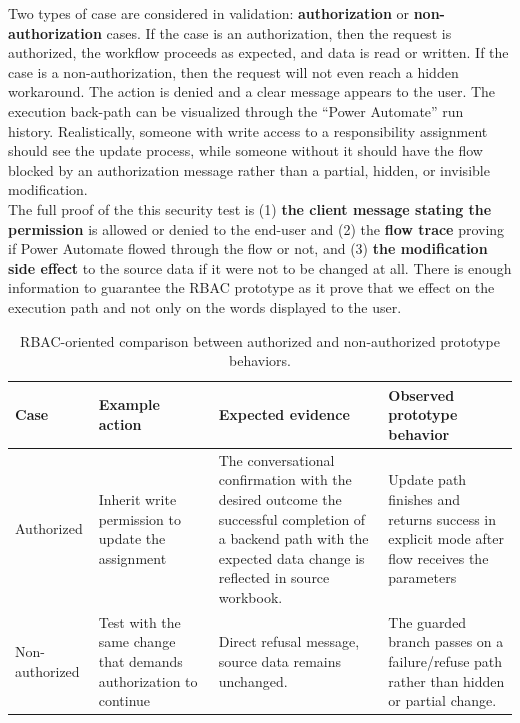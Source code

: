 Two types of case are considered in validation: \textbf{authorization} or \textbf{non-authorization} cases. If the case is an authorization, then the request is authorized, the workflow proceeds as expected, and data is read or written. If the case is a non-authorization, then the request will not even reach a hidden workaround. The action is denied and a clear message appears to the user. The execution back-path can be visualized through the “Power Automate” run history. Realistically, someone with write access to a responsibility assignment should see the update process, while someone without it should have the flow blocked by an authorization message rather than a partial, hidden, or invisible modification.\\
The full proof of the this security test is (1) \textbf{the client message stating the permission} is allowed or denied to the end-user and (2) the \textbf{flow trace} proving if Power Automate flowed through the flow or not, and (3) \textbf{the modification side effect} to the source data if it were not to be changed at all. There is enough information to guarantee the RBAC prototype as it prove that we effect on the execution path and not only on the words displayed to the user.
\begin{table}[H]
\centering
\footnotesize
\renewcommand{\arraystretch}{1.25}
\caption{RBAC-oriented comparison between authorized and non-authorized prototype behaviors.}
\label{tab:rbac-validation-cases}
\begin{tabularx}{\textwidth}{|p{2.7cm}|p{2.6cm}|X|X|}
\hline
\rowcolor[HTML]{E6F2FF}\textcolor[HTML]{003D99}{\textbf{Case}} & \textcolor[HTML]{003D99}{\textbf{Example action}} & \textcolor[HTML]{003D99}{\textbf{Expected evidence}} & \textcolor[HTML]{003D99}{\textbf{Observed prototype behavior}} \\
\hline
Authorized & Inherit write permission to update the assignment & The conversational confirmation with the desired outcome the successful completion of a backend path with the expected data change is reflected in source workbook. & Update path finishes and returns success in explicit mode after flow receives the parameters \\
\hline
Non-authorized & Test with the same change that demands authorization to continue & Direct refusal message,  source data remains unchanged. & The guarded branch passes on a failure/refuse path rather than hidden or partial change. \\
\hline
\end{tabularx}
\end{table}


